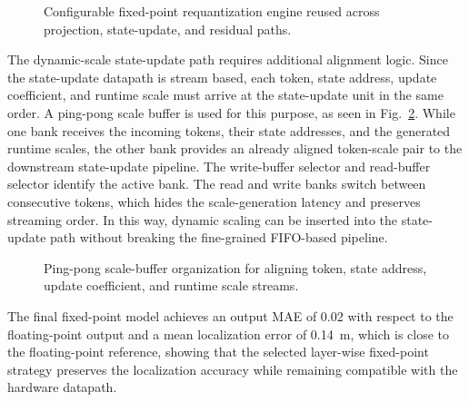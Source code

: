 \documentclass[lettersize,journal]{IEEEtran}
\begin{document}
\begin{figure}[!t]
\centering

\caption{Configurable fixed-point requantization engine reused across
projection, state-update, and residual paths.}
\label{fig:requant_engine}
\end{figure}

The dynamic-scale state-update path requires additional alignment logic. Since the
state-update datapath is stream based, each token, state address, update
coefficient, and runtime scale must arrive at the state-update unit in the same
order. A ping-pong scale buffer is used for this purpose, as seen in
Fig.~\ref{fig:ping_pong}.
While one bank receives the incoming tokens, their state addresses, and the
generated runtime scales, the other bank provides an already aligned
token-scale pair to the downstream state-update pipeline. The write-buffer
selector and read-buffer selector identify the active bank. The read and write
banks switch between consecutive tokens, which hides the
scale-generation latency and preserves streaming order. In this way, dynamic
scaling can be inserted into the state-update path without breaking the
fine-grained FIFO-based pipeline.

\begin{figure}[!t]
\centering

\caption{Ping-pong scale-buffer organization for aligning token, state address,
update coefficient, and runtime scale streams.}
\label{fig:ping_pong}
\end{figure}

The final fixed-point model achieves an
output MAE of 0.02 with respect to the floating-point output and a mean
localization error of 0.14~m, which is close to the
floating-point reference,
showing that the selected layer-wise fixed-point strategy preserves the
localization accuracy while remaining compatible with the hardware datapath.

\end{document}
